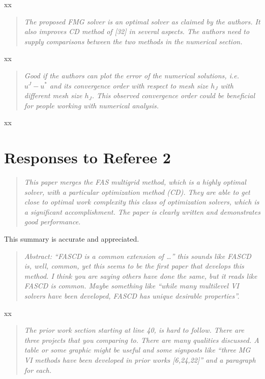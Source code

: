 \documentclass[letterpaper,final,12pt,reqno]{amsart}
\newenvironment{review}%
{\bigskip \par \begin{quote} \selectfont \sl}%
{\end{quote}}
\begin{document}
\noindent xx

\begin{review}
The proposed FMG solver is an optimal solver as claimed by the authors. It also improves CD method of [32] in several aspects. The authors need to supply comparisons between the two methods in the numerical section.
\end{review}

\noindent xx

\begin{review}
Good if the authors can plot the error of the numerical solutions, i.e. $u^J - u^*$ and its convergence order with respect to mesh size $h_J$ with different mesh size $h_J$. This observed convergence order could be beneficial for people working with numerical analysis.
\end{review}

\noindent xx


\section{Responses to Referee 2}

\begin{review}
This paper merges the FAS multigrid method, which is a highly optimal solver, with a particular optimization method (CD).  They are able to get close to optimal work complexity this class of optimization solvers, which is a significant accomplishment.  The paper is clearly written and demonstrates good performance.
\end{review}

\noindent This summary is accurate and appreciated.

\begin{review}
Abstract: ``FASCD is a common extension of \dots'' this sounds like FASCD is, well, common, yet this seems to be the first paper that develops this method.  I think you are saying others have done the same, but it reads like FASCD is common.  Maybe something like ``while many multilevel VI solvers have been developed, FASCD has unique desirable properties''.
\end{review}

\noindent xx

\begin{review}
The prior work section starting at line 40, is hard to follow.  There are three projects that you comparing to.  There are many qualities discussed.  A table or some graphic might be useful and some signposts like ``three MG VI methods have been developed in prior works [6,24,22]'' and a paragraph for each.
\end{review}
\end{document}
